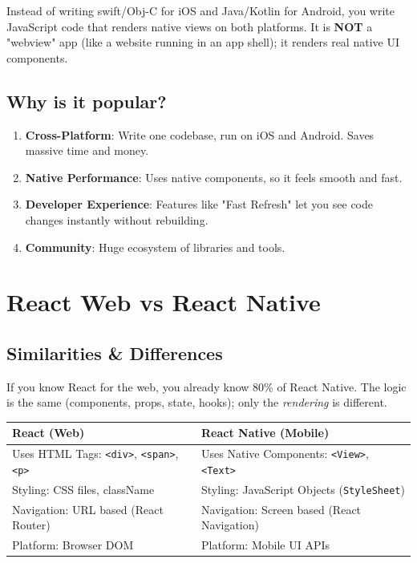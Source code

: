 \documentclass[11pt,a4paper,oneside]{book}
\begin{document}
Instead of writing swift/Obj-C for iOS and Java/Kotlin for Android, you write JavaScript code that renders native views on both platforms. It is \textbf{NOT} a "webview" app (like a website running in an app shell); it renders real native UI components.

\section{Why is it popular?}

\begin{enumerate}
    \item \textbf{Cross-Platform}: Write one codebase, run on iOS and Android. Saves massive time and money.
    \item \textbf{Native Performance}: Uses native components, so it feels smooth and fast.
    \item \textbf{Developer Experience}: Features like "Fast Refresh" let you see code changes instantly without rebuilding.
    \item \textbf{Community}: Huge ecosystem of libraries and tools.
\end{enumerate}

\chapter{React Web vs React Native}

\section{Similarities & Differences}

If you know React for the web, you already know 80\% of React Native. The logic is the same (components, props, state, hooks); only the \textit{rendering} is different.

\begin{comparisonbox}
\begin{tabularx}{\textwidth}{X | X}
\textbf{React (Web)} & \textbf{React Native (Mobile)} \\
\midrule
Uses HTML Tags: \texttt{<div>}, \texttt{<span>}, \texttt{<p>} & Uses Native Components: \texttt{<View>}, \texttt{<Text>} \\
\midrule
Styling: CSS files, className & Styling: JavaScript Objects (\texttt{StyleSheet}) \\
\midrule
Navigation: URL based (React Router) & Navigation: Screen based (React Navigation) \\
\midrule
Platform: Browser DOM & Platform: Mobile UI APIs \\
\end{tabularx}
\end{comparisonbox}
\end{document}
